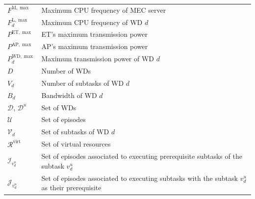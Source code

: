 \documentclass[12pt,draftclsnofoot,onecolumn]{IEEEtran}
\begin{document}
\begin{table}
{\begin{tabular}{ |p{2cm}|p{12cm}|}
			$F^{\text{M},\max}$ & Maximum CPU frequency of MEC server \\
			$F^{\text{L},\max}_{d}$ & Maximum CPU frequency of WD $d$ \\
			$P^{\text{ET},\max}$ & ET's maximum transmission power \\
			$P^{\text{AP},\max}$ & AP's maximum transmission power \\
			$P^{\text{WD},\max}_d$ & Maximum transmission power of WD $d$ \\
			$D$ & Number of WDs \\
			$V_d$ & Number of subtasks of WD $d$ \\
			$B_d$ & Bandwidth of WD $d$ \\
			$\mathcal{D}$, $\mathcal{D}^u$ & Set of WDs \\ 
			$\mathcal{U}$ & Set of episodes \\
			$\mathcal{V}_d$ & Set of subtasks of WD $d$ \\
			$\mathcal{R}^{\text{virt}}$ & Set of virtual resources \\
			$\mathcal{I}_{v_d^u}$ & Set of episodes associated to executing prerequisite subtasks of the subtask $v_d^u$ \\
			$\mathcal{J}_{v_d^u}$ & Set of episodes associated to executing subtasks with the subtask $v_d^u$ as their prerequisite \\
			\hline
	\end{tabular}}
\end{table}
\end{document}
